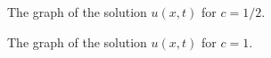 \documentclass[12pt]{article} %
\begin{document}
\begin{solution}
\begin{enumerate}[(a)]
                \begin{figure}[H]
                	\centering
                	\def\svgwidth{0.6\columnwidth}
                	
                    \caption{The graph of the solution $u(x,t)$ for $c=1/2$.}
                \end{figure}
                \begin{figure}[H]
                                	\centering
                                	\def\svgwidth{0.6\columnwidth}
                                	
                                    \caption{The graph of the solution $u(x,t)$ for $c=1$.}
                                \end{figure}
\end{enumerate}
\end{solution}
\end{document}
